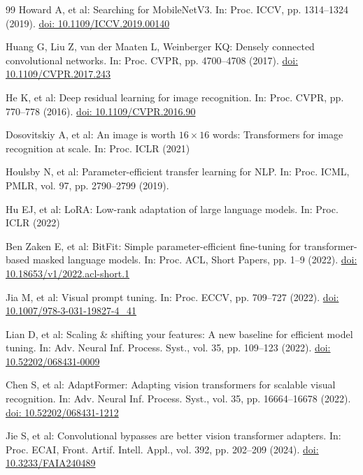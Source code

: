 \documentclass[pdflatex,sn-mathphys-num]{sn-jnl}
\theoremstyle{thmstyleone}
\theoremstyle{thmstyletwo}
\theoremstyle{thmstylethree}
\begin{document}
\begin{thebibliography}{99}
Howard A, et al:
Searching for MobileNetV3.
In: Proc. ICCV, pp. 1314--1324 (2019).
\href{https://doi.org/10.1109/ICCV.2019.00140}{doi: 10.1109/ICCV.2019.00140}

Huang G, Liu Z, van der Maaten L, Weinberger KQ:
Densely connected convolutional networks.
In: Proc. CVPR, pp. 4700--4708 (2017).
\href{https://doi.org/10.1109/CVPR.2017.243}{doi: 10.1109/CVPR.2017.243}

He K, et al:
Deep residual learning for image recognition.
In: Proc. CVPR, pp. 770--778 (2016).
\href{https://doi.org/10.1109/CVPR.2016.90}{doi: 10.1109/CVPR.2016.90}

Dosovitskiy A, et al:
An image is worth $16\times16$ words: Transformers for image recognition at scale.
In: Proc. ICLR (2021)

Houlsby N, et al:
Parameter-efficient transfer learning for NLP.
In: Proc. ICML, PMLR, vol. 97, pp. 2790--2799 (2019).

Hu EJ, et al:
LoRA: Low-rank adaptation of large language models.
In: Proc. ICLR (2022)

Ben Zaken E, et al:
BitFit: Simple parameter-efficient fine-tuning for transformer-based masked language models.
In: Proc. ACL, Short Papers, pp. 1--9 (2022).
\href{https://doi.org/10.18653/v1/2022.acl-short.1}{doi: 10.18653/v1/2022.acl-short.1}

Jia M, et al:
Visual prompt tuning.
In: Proc. ECCV, pp. 709--727 (2022).
\href{https://doi.org/10.1007/978-3-031-19827-4_41}{doi: 10.1007/978-3-031-19827-4\_41}

Lian D, et al:
Scaling \& shifting your features: A new baseline for efficient model tuning.
In: Adv. Neural Inf. Process. Syst., vol. 35, pp. 109--123 (2022).
\href{https://doi.org/10.52202/068431-0009}{doi: 10.52202/068431-0009}

Chen S, et al:
AdaptFormer: Adapting vision transformers for scalable visual recognition.
In: Adv. Neural Inf. Process. Syst., vol. 35, pp. 16664--16678 (2022).
\href{https://doi.org/10.52202/068431-1212}{doi: 10.52202/068431-1212}

Jie S, et al:
Convolutional bypasses are better vision transformer adapters.
In: Proc. ECAI, Front. Artif. Intell. Appl., vol. 392, pp. 202--209 (2024).
\href{https://doi.org/10.3233/FAIA240489}{doi: 10.3233/FAIA240489}


\end{thebibliography}
\end{document}

